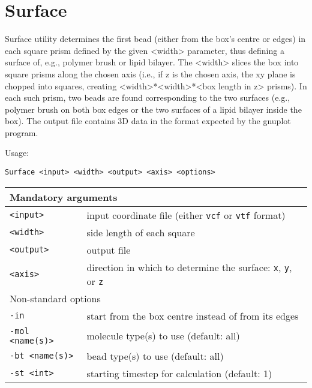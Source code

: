 \section{Surface} \label{sec:Surface}

Surface utility determines the first bead (either from the box's centre or
edges) in each square prism defined by the given <width> parameter, thus
defining a surface of, e.g., polymer brush or lipid bilayer. The <width>
slices the box into square prisms along the chosen axis (i.e., if z is the
chosen axis, the xy plane is chopped into squares, creating
<width>*<width>*<box length in z> prisms). In each such prism, two beads
are found corresponding to the two surfaces (e.g., polymer brush on both
box edges or the two surfaces of a lipid bilayer inside the box). The
output file contains 3D data in the format expected by the gnuplot program.

Usage:

\vspace{1em}
\noindent
\texttt{Surface <input> <width> <output> <axis> <options>}

\noindent
\begin{longtable}{p{}p{}}
  \toprule
  \multicolumn{2}{l}{Mandatory arguments} \\
  \midrule
  \texttt{<input>} & input coordinate file (either \texttt{vcf} or
    \texttt{vtf} format) \\
  \texttt{<width>} & side length of each square \\
  \texttt{<output>} & output file \\
  \texttt{<axis>} & direction in which to determine the surface: \texttt{x},
    \texttt{y}, or \texttt{z} \\
  \toprule
  \multicolumn{2}{l}{Non-standard options} \\
  \midrule
  \texttt{-in} & start from the box centre instead of from its edges \\
  \texttt{-mol <name(s)>} & molecule type(s) to use (default: all) \\
  \texttt{-bt <name(s)>} & bead type(s) to use (default: all) \\
  \texttt{-st <int>} & starting timestep for calculation (default: 1) \\
  \bottomrule
\end{longtable}

